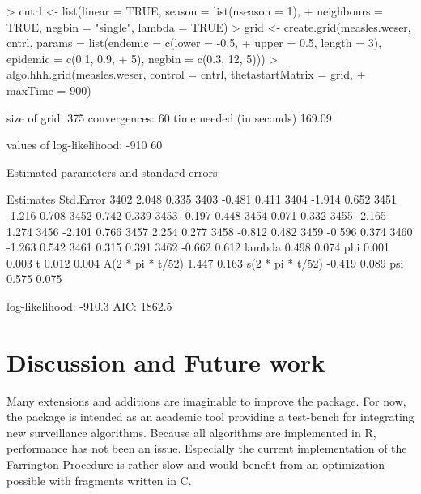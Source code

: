 \documentclass[a4paper,11pt]{article}
\begin{document}
\begin{Schunk}
\begin{Sinput}
> cntrl <- list(linear = TRUE, season = list(nseason = 1), 
+     neighbours = TRUE, negbin = "single", lambda = TRUE)
> grid <- create.grid(measles.weser, cntrl, params = list(endemic = c(lower = -0.5, 
+     upper = 0.5, length = 3), epidemic = c(0.1, 0.9, 
+     5), negbin = c(0.3, 12, 5)))
> algo.hhh.grid(measles.weser, control = cntrl, thetastartMatrix = grid, 
+     maxTime = 900)
\end{Sinput}
\end{Schunk}
\begin{Schunk}
\begin{Soutput}
size of grid:  375 
convergences:  60 
time needed (in seconds) 169.09 

values of log-likelihood:
-910 
  60 

Estimated parameters and standard errors: 

                  Estimates  Std.Error
3402                  2.048      0.335
3403                 -0.481      0.411
3404                 -1.914      0.652
3451                 -1.216      0.708
3452                  0.742      0.339
3453                 -0.197      0.448
3454                  0.071      0.332
3455                 -2.165      1.274
3456                 -2.101      0.766
3457                  2.254      0.277
3458                 -0.812      0.482
3459                 -0.596      0.374
3460                 -1.263      0.542
3461                  0.315      0.391
3462                 -0.662      0.612
lambda                0.498      0.074
phi                   0.001      0.003
t                     0.012      0.004
A(2 * pi * t/52)      1.447      0.163
s(2 * pi * t/52)     -0.419      0.089
psi                   0.575      0.075

log-likelihood:	 -910.3 
AIC:		 1862.5 
\end{Soutput}
\end{Schunk}



\section{Discussion and Future work}
Many extensions and additions are imaginable to improve the package.
For now, the package is intended as an academic tool providing a
test-bench for integrating new surveillance algorithms. Because all
algorithms are implemented in R, performance has not been an issue.
Especially the current implementation of the Farrington Procedure is
rather slow and would benefit from an optimization possible with
fragments written in C.
\end{document}
